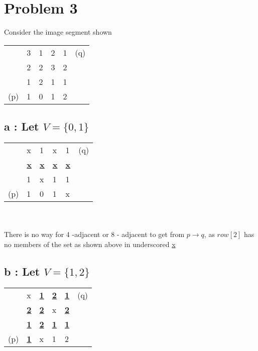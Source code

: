 \documentclass[12pt]{article}
\begin{document}
    \section{Problem 3}
            Consider the image segment shown 
            \\
            \begin{tabular}{ l l l l l l  }
                & 3 & 1 & 2 & 1 & (q) \\
                & 2 & 2 & 3 & 2 & \\
                & 1 & 2 & 1 & 1 & \\
                (p) & 1 & 0 & 1 & 2 & \\
            \end{tabular}
            \subsection{a : Let ${V=\{0,1\}}$}
                
                \begin{tabular}{ l l l l l l  }
                    & x & 1 & x & 1 & (q) \\
                    &  \underline{\textbf{x}} &  \underline{\textbf{x}} &  \underline{\textbf{x}} &  \underline{\textbf{x}} & \\
                    & 1 & x & 1 & 1 & \\
                    (p) & 1 & 0 & 1 & x & \\
                \end{tabular}
            \\
            \\

             There is no way for 4 -adjacent or 8 - adjacent to get from
             $p \to q$, as $row[2]$ has no members of the set as shown above in 
             underscored \underline{x}

             \subsection{b : Let ${V=\{1,2\}}$}
             \begin{tabular}{ l l l l l l  }
                & x & \underline{\textbf{1}} & \underline{\textbf{2}} & \underline{\textbf{1}} & (q) \\
                & \underline{\textbf{2}} & \underline{\textbf{2}} & x & \underline{\textbf{2}} & \\
                & \underline{\textbf{1}} & \underline{\textbf{2}} & \underline{\textbf{1}} & \underline{\textbf{1}} & \\
                (p) & \underline{\textbf{1}} & x & 1 & 2 & \\
             \end{tabular}
             \\
             \\
             
\end{document}
